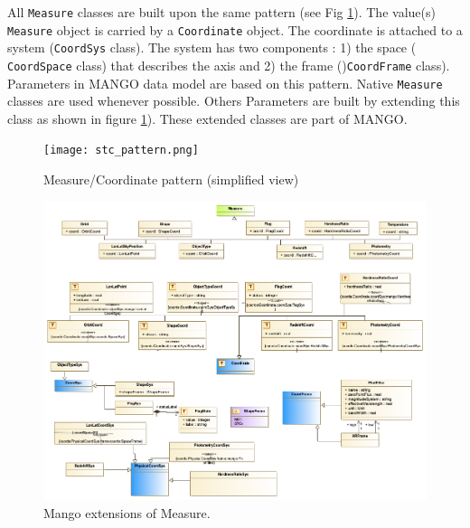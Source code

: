 \documentclass[11pt,a4paper]{ivoa}
\begin{document}
All \texttt{Measure} classes are built upon the same pattern (see Fig \ref{fig:stcpattern}). The value(s) \texttt{Measure} object is carried by a \texttt{Coordinate} object. The coordinate is attached to a system  (\texttt{CoordSys} class). The system has two components : 1) the space  ( \texttt{CoordSpace} class) that describes the axis and 2) the frame ()\texttt{CoordFrame} class).  Parameters in MANGO data model are based on this pattern. Native  \texttt{Measure} classes are used whenever possible. Others Parameters are built by extending this class as shown in figure \ref{fig:stcpattern}). These extended classes are part of MANGO.
\begin{figure}
     \texttt{[image: stc\_pattern.png]}
     \caption{Measure/Coordinate pattern (simplified view)}
     \label{fig:stcpattern}
\end{figure}

\begin{figure}
  \includegraphics[angle=90,origin=c,width=1\textwidth]{../model/mangoMctExt.png}
  \caption{Mango extensions of Measure.}
  \label{fig:stcextension}
\end{figure}
\end{document}
